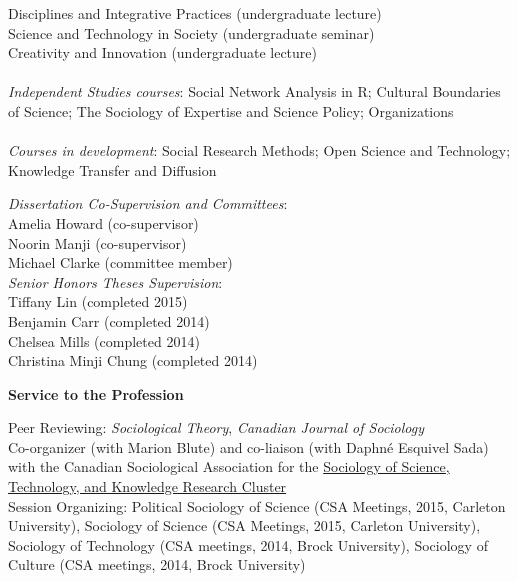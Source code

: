 \documentclass[9pt,usenames,dvipsnames]{article}
\begin{document}
\noindent Disciplines and Integrative Practices (undergraduate lecture) \\
\noindent Science and Technology in Society (undergraduate seminar) \\
\noindent Creativity and Innovation (undergraduate lecture) \\ 
\\
\noindent \emph{Independent Studies courses}: Social Network Analysis in R; Cultural Boundaries of Science; The Sociology of Expertise and Science Policy; Organizations \\ %
\\
\noindent \emph{Courses in development}: Social Research Methods; Open Science and Technology; Knowledge Transfer and Diffusion \\

\newpage
{}

\noindent \emph{Dissertation Co-Supervision and Committees}:  \\
\noindent Amelia Howard (co-supervisor) \\
\noindent Noorin Manji (co-supervisor) \\
\noindent Michael Clarke (committee member) \\

\noindent \emph{Senior Honors Theses Supervision}: \\
\noindent Tiffany Lin (completed 2015) \\
\noindent Benjamin Carr (completed 2014) \\ 
\noindent Chelsea Mills (completed 2014) \\ 
\noindent Christina Minji Chung (completed 2014) \\


\ind \textbf{Service to the Profession}

\noindent Peer Reviewing: {\it Sociological Theory}, {\it Canadian Journal of Sociology}\\

\noindent Co-organizer (with Marion Blute) and co-liaison (with Daphné Esquivel Sada) with the Canadian Sociological Association for the \href{http://www.csa-scs.ca/files/webapps/csapress/sstk/}{Sociology of Science, Technology, and Knowledge Research Cluster}\\

\noindent Session Organizing: Political Sociology of Science (CSA Meetings, 2015, Carleton University), Sociology of Science (CSA Meetings, 2015, Carleton University), Sociology of Technology (CSA meetings, 2014, Brock University), Sociology of Culture (CSA meetings, 2014, Brock University) \\
\end{document}

